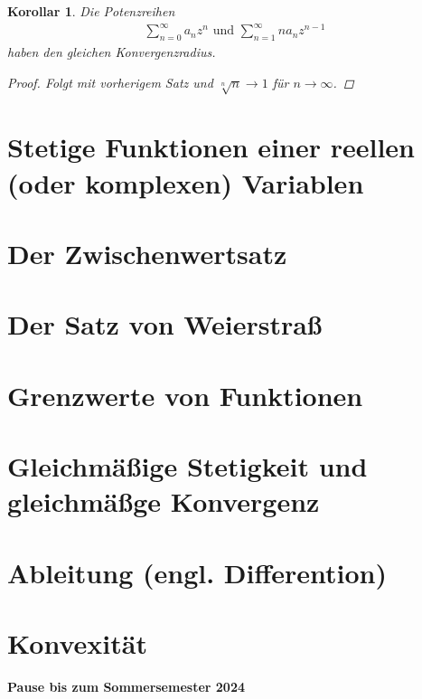\documentclass[11pt, twoside, a4paper]{article}
\theoremstyle{plain}
\newtheorem{korollar}[blockelement]{Korollar}
\newcommand{\fromto}{\rightarrow{}}
\begin{document}
    \begin{korollar}
        Die Potenzreihen
        \begin{align*}
            \sum_{n=0}^{\infty} a_n z^n \text{ und } \sum_{n=1}^{\infty} n a_n z^{n-1}
        \end{align*}
        haben den gleichen Konvergenzradius.
        \begin{proof}
            Folgt mit vorherigem Satz und $\sqrt[n]{n}\fromto 1$ für $n\fromto\infty$.
        \end{proof}
    \end{korollar}

    \newpage


    \section{Stetige Funktionen einer reellen (oder komplexen) Variablen}
    


    \section{Der Zwischenwertsatz}
    


    \section{Der Satz von Weierstraß}
    


    \section{Grenzwerte von Funktionen}
    


    \section{Gleichmäßige Stetigkeit und gleichmäßge Konvergenz}
    


    \section{Ableitung (engl. Differention)}
    


    \section{Konvexität}
    

    \vfill

    \begin{center}
        \textbf{\LARGE Pause bis zum Sommersemester 2024}
    \end{center}

    \vfill
\end{document}
